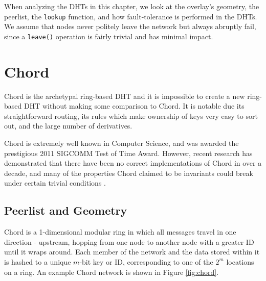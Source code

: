 When analyzing the DHTs in this chapter, we look at the overlay's geometry, the peerlist, the \texttt{lookup} function, and how fault-tolerance is performed in the DHTs.
We assume that nodes never politely leave the network but always abruptly fail, since a \texttt{leave()} operation is fairly trivial and has minimal impact.


\section{Chord}



Chord \cite{chord} is the archetypal ring-based DHT and it is impossible to create a new ring-based DHT without making some comparison to Chord.
It is notable due its straightforward routing, its rules which make ownership of keys very easy to sort out, and the large number of derivatives.



Chord is extremely well known in Computer Science, and was awarded the prestigious 2011 SIGCOMM Test of Time Award.
However, recent research has demonstrated that there have been no correct implementations of Chord in over a decade, and many of  the properties  Chord claimed to be invariants could break under certain trivial conditions \cite{zave2012using}.




\subsection*{Peerlist and Geometry}
Chord is a 1-dimensional modular ring in which all messages travel in one direction - upstream, hopping from one node to another node with a greater ID until it wraps around.
Each member of the network and the data stored within it is hashed to a unique $m$-bit key or ID, corresponding to one of the $2^m$ locations on a ring. 
An example Chord network is shown in Figure \ref{fig:chord}.



